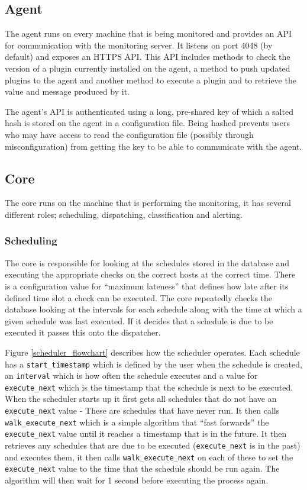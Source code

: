 \documentclass[bsc,deptreport,twoside,parskip,singlespacing,notimes]{infthesis}
\begin{document}
\subsection{Agent}

	The agent runs on every machine that is being monitored and provides an API for
	communication with the monitoring server.  It listens on port 4048 (by default)
	and exposes an HTTPS API.  This API includes methods to check the version of a
	plugin currently installed on the agent, a method to push updated plugins to
	the agent and another method to execute a plugin and to retrieve the value and
	message produced by it.


	The agent's API is authenticated using a long, pre-shared key of which a salted
	hash is stored on the agent in a configuration file.  Being hashed prevents
	users who may have access to read the configuration file (possibly through
	misconfiguration) from getting the key to be able to communicate with the
	agent.

\subsection{Core}

	The core runs on the machine that is performing the monitoring, it has several
	different roles; scheduling, dispatching, classification and alerting.

\subsubsection{Scheduling}

	The core is responsible for looking at the schedules stored in the database and
	executing the appropriate checks on the correct hosts at the correct time.
	There is a configuration value for ``maximum lateness'' that defines how late
	after its defined time slot a check can be executed.  The core repeatedly
	checks the database looking at the intervals for each schedule along with the
	time at which a given schedule was last executed.  If it decides that a
	schedule is due to be executed it passes this onto the dispatcher.


	Figure \ref{scheduler_flowchart} describes how the scheduler operates.  Each
	schedule has a \linebreak\texttt{start\_timestamp} which is defined by the user
	when the schedule is created, an \texttt{interval} which is how often the
	schedule executes and a value for \texttt{execute\_next} which is the timestamp
	that the schedule is next to be executed.  When the scheduler starts up it
	first gets all schedules that do not have an \texttt{execute\_next} value -
	These are schedules that have never run.  It then calls
	\texttt{walk\_execute\_next} which is a simple algorithm that ``fast forwards''
	the \texttt{execute\_next} value until it reaches a timestamp that is in the
	future.  It then retrieves any schedules that are due to be executed
	(\texttt{execute\_next} is in the past) and executes them, it then calls
	\texttt{walk\_execute\_next} on each of these to set the \texttt{execute\_next}
	value to the time that the schedule should be run again.  The algorithm will
	then wait for 1 second before executing the process again.
\end{document}
